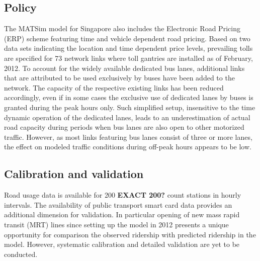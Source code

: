 \subsection{Policy}
The MATSim model for Singapore also includes the Electronic Road Pricing (ERP) scheme featuring time and vehicle dependent road pricing. Based on two data sets indicating the location and time dependent price levels, prevailing tolls are specified for 73 network links where toll gantries are installed as of February, 2012.
To account for the widely available dedicated bus lanes, additional links that are attributed to be used exclusively by buses have been added to the network. The capacity of the respective existing links has been reduced accordingly, even if in some cases the exclusive use of dedicated lanes by buses is granted during the peak hours only. Such simplified setup, insensitive to the time dynamic operation of the dedicated lanes, leads to an underestimation of actual road capacity during periods when bus lanes are also open to other motorized traffic. However, as most links featuring bus lanes consist of three or more lanes, the effect on modeled traffic conditions during off-peak hours appears to be low.

\subsection{Calibration and validation}
Road usage data is available for 200 \textbf{EXACT 200?} count stations in hourly intervals. The availability of public transport smart card data provides an additional dimension for validation. In particular opening of new mass rapid transit (MRT) lines since setting up the model in 2012 presents a unique opportunity for comparison the observed ridership with predicted ridership in the model. However, systematic calibration and detailed validation are yet to be conducted.

